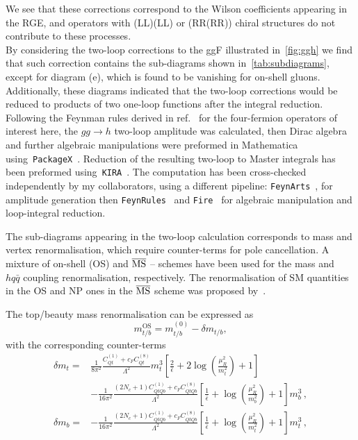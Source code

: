 	\par We see that these corrections correspond to the Wilson coefficients appearing in the RGE, and operators with (LL)(LL) or (RR(RR)) chiral structures do not contribute to these processes. \\ By considering the two-loop corrections to the ggF illustrated in~\autoref{fig:ggh} we find that such correction contains the sub-diagrams shown in~\autoref{tab:subdiagrams}, except for diagram (e), which is found to be vanishing for on-shell gluons. Additionally, these diagrams indicated that the two-loop corrections would be reduced to products of two one-loop functions after the integral reduction. \\
	Following the Feynman rules derived in ref.~\cite{Dedes:2017zog} for the four-fermion operators of interest here, the $ gg \to h$ two-loop amplitude was calculated, then Dirac algebra and further algebraic manipulations were preformed in Mathematica using~\texttt{PackageX}~\cite{Patel:2015tea}. Reduction of the resulting two-loop to Master integrals has been preformed using~\texttt{KIRA}~\cite{Maierhoefer:2017hyi}. The computation has been cross-checked independently by my collaborators, using a different pipeline: \texttt{FeynArts}~\cite{Hahn:2000kx}, for amplitude generation then  \texttt{FeynRules}~\cite{Alloul:2013bka}  and  \texttt{Fire}~\cite{Smirnov:2008iw} for algebraic manipulation and loop-integral reduction. \\
	\par
	The sub-diagrams appearing in the two-loop calculation corresponds to mass and vertex renormalisation, which require counter-terms for pole cancellation. A mixture of on-shell (OS) and $\overline{\mathrm{MS}}$ -- schemes have been used for the mass and ~$h q \bar{q}$ coupling renormalisation, respectively. The renormalisation of SM quantities in the OS and NP ones in the $\overline{\mathrm{MS}}$ scheme was proposed by~\cite{Dawson:2018pyl}.
	\par The top/beauty mass renormalisation can be expressed as  
	\begin{equation}
		m_{t/b}^{\text{OS}}=m_{t/b}^{(0)}-\delta m_{t/b},
	\end{equation}
	with the corresponding counter-terms
	\begin{align}
		\delta m_t =&\frac{1}{8 \pi^2} \frac{C_{Qt}^{(1)}+c_F C_{Qt}^{(8)}}{\Lambda^2}m_t^3\left[ \frac{2}{\bar{\epsilon}} +2 \log\left(\frac{\mu_R^2}{m_t^2}\right)+1\right] \\ &- \frac{1}{16 \pi^2}  \frac{(2 N_c+1) C_{QtQb}^{(1)}+c_F C_{QtQb}^{(8)}}{\Lambda^2}  \left[ \frac{1}{\bar{\epsilon}} +  \log\left(\frac{\mu_R^2}{m_b^2}\right)+1 \right]  m_b^3\,, \nonumber \\
		\delta m_b=&-\frac{1}{16 \pi^2} \frac{(2 N_c+1)C_{QtQb}^{(1)}+c_F C_{QtQb}^{(8)}}{\Lambda^2}\left[ \frac{1}{\bar{\epsilon}} +\log\left( \frac{\mu_R^2}{m_t^2}\right)+1\right] m_t^3\,,
	\end{align}
